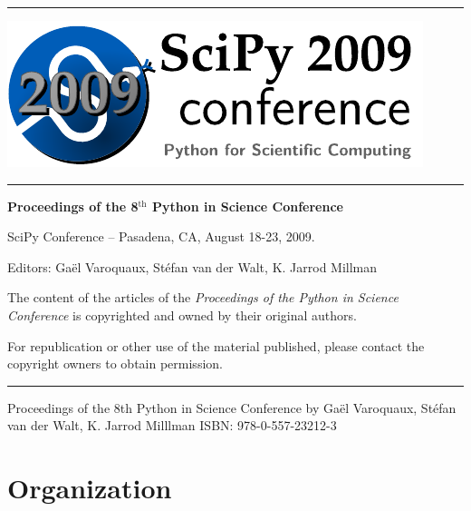 
\thispagestyle{empty}

\vbox{}
\vfill
\vfill
\vfill
\begin{center}
\rule{.9\linewidth}{.2ex}

\includegraphics[width=\linewidth]{scipy2009confs}

\rule{.9\linewidth}{.2ex}

\vfill

{\sffamily\bfseries
{\huge
Proceedings of the 8$^{\text{th}}$ Python in Science Conference}

\bigskip
\large
SciPy Conference -- 
Pasadena, CA, August 18-23,
2009. 
}

\vfill
\vfill
\vfill
\hline

Editors: \quad Ga\"el {\sc Varoquaux},  \quad 
St\'efan {\sc van der Walt}, \quad K. Jarrod {\sc Millman}
\end{center}
\vfill
\vfill
\vfill

\pagebreak

\thispagestyle{empty}

\cleardoublepage 

\setcounter{page}{0}
\vbox{}
\vfill
\thispagestyle{empty}
\tableofcontents
\vfill

{\small
	The content of the articles of the {\sl Proceedings of the Python in
	Science Conference} is copyrighted and owned by their original
	authors.

	For republication or other use of the material published, please
        contact the copyright owners to obtain permission.

    \bigskip
    \hrule


Proceedings of the 8th Python in Science Conference
by Ga\"el Varoquaux, St\'efan van der Walt, K. Jarrod Milllman
ISBN:   978-0-557-23212-3

}

\vfill
\vbox{}
\markright{}{}
\markbox{}{}
\clearpage
\thispagestyle{empty}
\section*{Organization}

